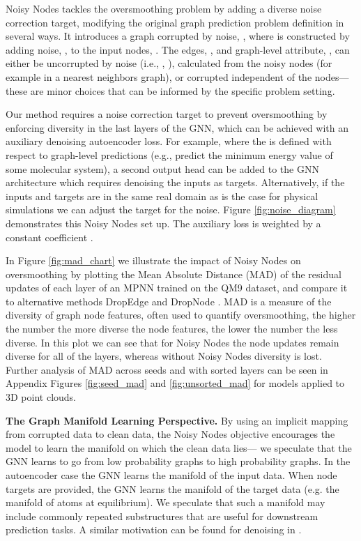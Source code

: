 \documentclass{article} \usepackage{iclr2022_conference,times}
\begin{document}
Noisy Nodes tackles the oversmoothing problem by adding a diverse noise correction target, modifying the original graph prediction problem definition in several ways. It introduces a graph corrupted by noise, , where  is constructed by adding noise, , to the input nodes, . The edges, , and graph-level attribute, , can either be uncorrupted by noise (i.e., , ), calculated from the noisy nodes (for example in a nearest neighbors graph), or corrupted independent of the nodes---these are minor choices that can be informed by the specific problem setting.

Our method requires a noise correction target to prevent oversmoothing by enforcing diversity in the last layers of the GNN, which can be achieved with an auxiliary denoising autoencoder loss. For example, where the  is defined with respect to graph-level predictions (e.g., predict the minimum energy value of some molecular system), a second output head can be added to the GNN architecture which requires denoising the inputs as targets. Alternatively, if the inputs and targets are in the same real domain as is the case for physical simulations we can adjust the target for the noise. Figure \ref{fig:noise_diagram} demonstrates this Noisy Nodes set up. The auxiliary loss is weighted by a constant coefficient . 

In Figure \ref{fig:mad_chart} we illustrate the impact of Noisy Nodes on oversmoothing by plotting the Mean Absolute Distance (MAD) \citep{Chen2020MeasuringAR} of the residual updates of each layer of an MPNN trained on the QM9 \citep{Ramakrishnan2014QuantumCS} dataset, and compare it to alternative methods DropEdge \citep{RongDropEdge2019} and DropNode \citep{Do2021GraphCN}. MAD is a measure of the diversity of graph node features, often used to quantify oversmoothing, the higher the number the more diverse the node features, the lower the number the less diverse. In this plot we can see that for Noisy Nodes the node updates remain diverse for all of the layers, whereas without Noisy Nodes diversity is lost. Further analysis of MAD across seeds and with sorted layers can be seen in Appendix Figures \ref{fig:seed_mad} and \ref{fig:unsorted_mad} for models applied to 3D point clouds.

\textbf{The Graph Manifold Learning Perspective.} By using an implicit mapping from corrupted data to clean data, the Noisy Nodes objective encourages the model to learn the manifold on which the clean data lies--- we speculate that the GNN learns to go from low probability graphs to high probability graphs. In the autoencoder case the GNN learns the manifold of the input data. When node targets are provided, the GNN learns the manifold of the target data (e.g. the manifold of atoms at equilibrium). We speculate that such a manifold may include commonly repeated substructures that are useful for downstream prediction tasks. A similar motivation can be found for denoising in \citep{Vincent2010StackedDA, Song2019GenerativeMB}.
\end{document}
